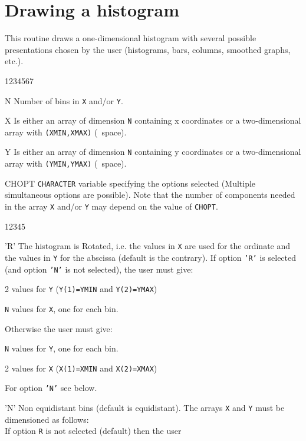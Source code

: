\section{Drawing a histogram}
\Action
This routine draws a one-dimensional histogram with several possible 
presentations chosen by the user (histograms, bars, columns, smoothed graphs,
etc.).
\Pdesc
\begin{DLtt}{1234567}
\item[N] Number of bins in {\tt X} and/or {\tt Y}.
\item[X] Is either an array of dimension {\tt N} containing x
         coordinates or a two-dimensional array with {\tt (XMIN,XMAX)}
         (\WC~space).
\item[Y] Is either an array of dimension {\tt N} containing y
         coordinates or a two-dimensional array with {\tt (YMIN,YMAX)}
         (\WC~space).
\item[CHOPT] {\tt CHARACTER} variable specifying the options
             selected (Multiple simultaneous options are possible).
             Note that the number of components needed in the array {\tt X}
             and/or {\tt Y} may depend on the value of {\tt CHOPT}.
\begin{DLtt}{12345}
   \item['R'] The histogram is Rotated, i.e. the values in {\tt X} are used
              for the ordinate and the values in {\tt Y} for the abscissa
              (default is the contrary). If option {\tt 'R'} is selected (and
              option {\tt 'N'} is not selected), the user must give:
   \begin{UL}
      \item 2 values for {\tt Y} ({\tt Y(1)=YMIN} and {\tt Y(2)=YMAX})
      \item {\tt N} values for {\tt X}, one for each bin.
   \end{UL}
   Otherwise the user must give:
   \begin{UL}
      \item {\tt N} values for {\tt Y}, one for each bin.
      \item 2 values for {\tt X} ({\tt X(1)=XMIN} and {\tt X(2)=XMAX})
   \end{UL}
   For option {\tt 'N'} see below.
   \item['N'] Non equidistant bins (default is equidistant). The arrays {\tt X}
              and {\tt Y} must be dimensioned as follows:
              \\ If option {\tt R} is not selected (default) then the user

\end{DLtt}
\end{DLtt}
